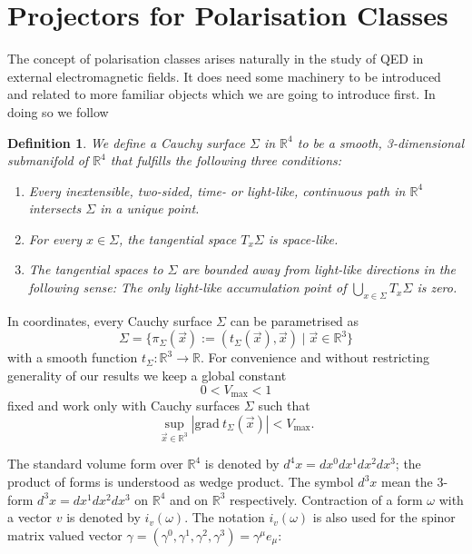 \documentclass[a4paper,11pt]{article}
\newtheorem{de}{Definition}
\begin{document}
\section{Projectors for Polarisation Classes}\label{sec:pol classes}

The concept of polarisation classes arises naturally in the study of QED in external electromagnetic fields. It does need some
machinery to be introduced and related to more familiar objects which we are going to introduce first. In doing so we follow \cite{ivp2}

\begin{de}
We define a Cauchy surface \(\Sigma\) in \(\mathbb{R}^4\) to be a smooth, 3-dimensional submanifold of \(\mathbb{R}^4\) that fulfills
the following three conditions:
\begin{enumerate}[label=\alph*)]
\item Every inextensible, two-sided, time- or light-like, continuous path in \(\mathbb{R}^4\) intersects \(\Sigma\) in a unique point.
\item For every \(x\in\Sigma\), the tangential space \(T_x\Sigma\) is space-like.
\item The tangential spaces to \(\Sigma\) are bounded away from light-like directions in the following sense: The only light-like accumulation point of 
\(\bigcup_{x\in \Sigma} T_x \Sigma\) is zero.
\end{enumerate}
\end{de}

In coordinates, every Cauchy surface \(\Sigma\) can be parametrised as
\begin{equation}
\Sigma= \{ \pi_\Sigma(\vec{x}):=(t_\Sigma(\vec{x}),\vec{x})\mid \vec{x}\in\mathbb{R}^3\}
\end{equation}
with a smooth function \(t_\Sigma: \mathbb{R}^3\rightarrow \mathbb{R}\). For convenience and without restricting generality of our results we keep a global constant 
\begin{equation}
0<V_{\max}<1
\end{equation}
fixed and work only with Cauchy surfaces \(\Sigma\) such that 
\begin{equation}\label{gamma max}
\sup_{\vec{x}\in\mathbb{R}^3} |\mathrm{grad}~ t_\Sigma( \vec{x})|<V_{\max}.
\end{equation}

The standard volume form over \(\mathbb{R}^4\) is denoted by \(d^4x=dx^0dx^1dx^2dx^3\); the product of forms is understood as wedge product. The symbol \(d^3x\) 
mean the 3-form \(d^3x=dx^1dx^2dx^3\) on \(\mathbb{R}^4\) and on \(\mathbb{R}^3\) respectively. Contraction of a form \(\omega\) with a vector \(v\) is
denoted by \(i_v(\omega)\). The notation \(i_v(\omega)\) is also used for the spinor matrix valued 
vector \(\gamma= (\gamma^0,\gamma^1,\gamma^2,\gamma^3)=\gamma^\mu e_\mu\):
\end{document}
